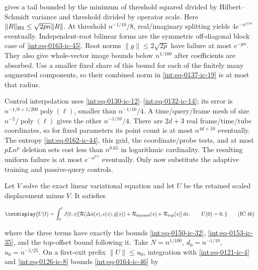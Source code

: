 
gives a tail bounded by the minimum of threshold squared divided by Hilbert--Schmidt variance and threshold divided by operator scale. Here \(\|R\|_{\rm HS}\le\sqrt{2pn}\|R\|\). At threshold \(n^{-1/10}/8\), real/imaginary splitting yields \(4e^{-n^{0.78}}\) eventually. Independent-root bilinear forms are the symmetric off-diagonal block case of \eqref{int:eq-0163-ic-45}. Root norms \(\|g\|\le2\sqrt{2p}\) have failure at most \(e^{-pn}\). They also give whole-vector image bounds below \(n^{1/100}\) after coefficients are absorbed. Use a smaller fixed share of this bound for each of the finitely many augmented components, so their combined norm in \eqref{int:eq-0137-ic-19} is at most that radius.



Control interpolation uses \eqref{int:eq-0130-ic-12}--\allowbreak \eqref{int:eq-0132-ic-14}; its error is \(n^{-1/8+1/200}\operatorname{poly}(\ell)\), smaller than \(n^{-1/10}/4\). A time/query/frame mesh of size \(n^{-2}/\operatorname{poly}(\ell)\) gives the other \(n^{-1/10}/4\). There are \(2d+3\) real frame/time/tube coordinates, so for fixed parameters its point count is at most \(n^{4d+10}\) eventually. The entropy \eqref{int:eq-0162-ic-44}, this grid, the coordinate/probe tests, and at most \(pLn^p\) deletion sets cost less than \(n^{0.65}\) in logarithmic cardinality. The resulting uniform failure is at most \(e^{-n^{0.7}}\) eventually. Only now substitute the adaptive training and passive-query controls.



Let \(V\) solve the exact linear variational equation and let \(U\) be the retained scaled displacement minus \(V\). It satisfies


\begingroup\renewcommand{\theHequation}{intdisplay.348}
\begin{equation}
\intdisplay{
U(t)=\int_0^t J(t,s)
  [\mathcal R(\Delta\bar u(s),e(s),\bar q(s))
       +\mathcal R_{\rm learned}(s)+\mathcal R_{\rm top}(s)]\,ds,
 \qquad U(0)=0,
}
\tag{IC.46}
\label{int:eq-0164-ic-46}
\end{equation}
\endgroup


where the three terms have exactly the bounds \eqref{int:eq-0150-ic-32}, \eqref{int:eq-0153-ic-35}, and the top-offset bound following it. Take \(N=n^{1/100}\), \(d_0=n^{-1/10}\), \(u_0=n^{-1/25}\). On a first-exit prefix \(\|U\|\le u_0\), integration with \eqref{int:eq-0121-ic-4} and \eqref{int:eq-0126-ic-8} bounds \eqref{int:eq-0164-ic-46} by


